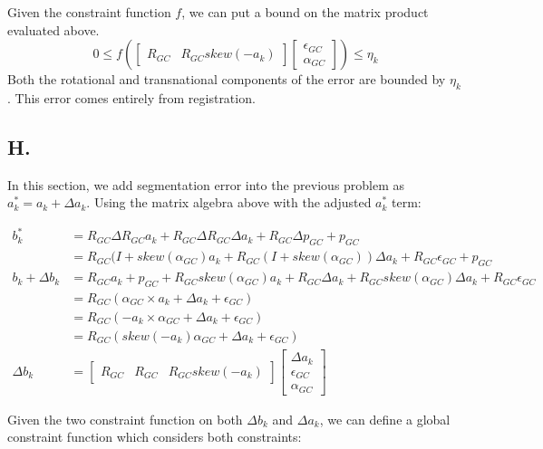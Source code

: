 \documentclass[letterpaper, 11pt]{article}
\begin{document}
Given the constraint function $f$, we can put a bound on the matrix product evaluated above.
$$0 \leq f\left(\begin{bmatrix}
    	R_{GC} & R_{GC}skew(-a_k)
    \end{bmatrix} 
    \begin{bmatrix}
    	\epsilon_{GC} \\
        \alpha_{GC}
     \end{bmatrix}\right) \leq \eta_k$$
Both the rotational and transnational components of the error are bounded by $\eta_k$. This error comes entirely from registration.
\subsection*{H.}
In this section, we add segmentation error into the previous problem as $a_k^* = a_k + \Delta a_k$. Using the matrix algebra above with the adjusted $a_k^*$ term:

\begin{align}
	b_k^* &= R_{GC}\Delta R_{GC}a_k + R_{GC}\Delta R_{GC}\Delta a_k + R_{GC}\Delta p_{GC} + p_{GC} \\
    &= R_{GC}(I + skew(\alpha_{GC})a_k + R_{GC}(I + skew(\alpha_{GC}))\Delta a_k + R_{GC}\epsilon_{GC} + p_{GC} \\
    b_k + \Delta b_k &= R_{GC}a_k + p_{GC} + R_{GC}skew(\alpha_{GC})a_k + R_{GC}\Delta a_k + R_{GC}skew(\alpha_{GC})\Delta a_k + R_{GC}\epsilon_{GC} \\
    &= R_{GC}(\alpha_{GC} \times a_k +\Delta a_k + \epsilon_{GC})  \\
    &= R_{GC}(-a_k \times \alpha_{GC} + \Delta a_k + \epsilon_{GC}) \\
    &= R_{GC}(skew(-a_k)\alpha_{GC} + \Delta a_k + \epsilon_{GC}) \\
    \Delta b_k &= \begin{bmatrix}
    	R_{GC} & R_{GC} & R_{GC}skew(-a_k)
    \end{bmatrix}
    \begin{bmatrix}
    	\Delta a_k \\
        \epsilon_{GC} \\
        \alpha_{GC}
    \end{bmatrix}
\end{align}

Given the two constraint function on both $\Delta b_k$ and $\Delta a_k$, we can define a global constraint function which considers both constraints:
\end{document}
